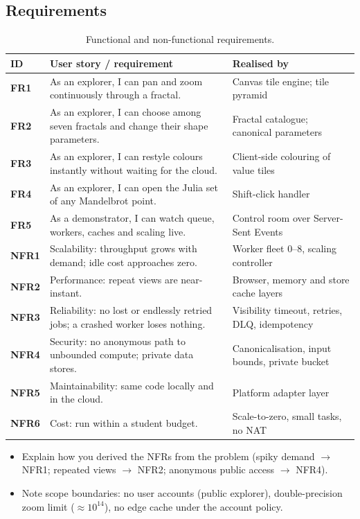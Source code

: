 \documentclass[a4paper,12pt]{article}
\begin{document}
\subsection{Requirements}

\begin{table}[H]
\centering
\small
\begin{tabularx}{\linewidth}{>{\bfseries}p{1.2cm} X >{\raggedright\arraybackslash}p{4.2cm}}
\toprule
ID & User story / requirement & Realised by \\
\midrule
FR1 & As an explorer, I can pan and zoom continuously through a fractal. & Canvas tile engine; tile pyramid \\
FR2 & As an explorer, I can choose among seven fractals and change their shape parameters. & Fractal catalogue; canonical parameters \\
FR3 & As an explorer, I can restyle colours instantly without waiting for the cloud. & Client-side colouring of value tiles \\
FR4 & As an explorer, I can open the Julia set of any Mandelbrot point. & Shift-click handler \\
FR5 & As a demonstrator, I can watch queue, workers, caches and scaling live. & Control room over Server-Sent Events \\
\midrule
NFR1 & Scalability: throughput grows with demand; idle cost approaches zero. & Worker fleet 0--8, scaling controller \\
NFR2 & Performance: repeat views are near-instant. & Browser, memory and store cache layers \\
NFR3 & Reliability: no lost or endlessly retried jobs; a crashed worker loses nothing. & Visibility timeout, retries, DLQ, idempotency \\
NFR4 & Security: no anonymous path to unbounded compute; private data stores. & Canonicalisation, input bounds, private bucket \\
NFR5 & Maintainability: same code locally and in the cloud. & Platform adapter layer \\
NFR6 & Cost: run within a student budget. & Scale-to-zero, small tasks, no NAT \\
\bottomrule
\end{tabularx}
\caption{Functional and non-functional requirements.}
\label{tab:requirements}
\end{table}

\begin{yourwriting}
\begin{itemize}
    \item Explain how you derived the NFRs from the problem (spiky demand $\rightarrow$ NFR1; repeated views $\rightarrow$ NFR2; anonymous public access $\rightarrow$ NFR4).
    \item Note scope boundaries: no user accounts (public explorer), double-precision zoom limit ($\approx 10^{14}$), no edge cache under the account policy.
\end{itemize}
\end{yourwriting}
\end{document}
